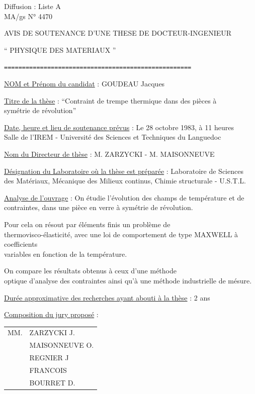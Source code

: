Diffusion : Liste A\\
MA/gs \qquad N° 4470

\begin{center}
AVIS DE SOUTENANCE D'UNE THESE DE DOCTEUR-INGENIEUR

`` PHYSIQUE \quad DES MATERIAUX ''

\texttt{====================================================}
\end{center}

\uline{NOM et Prénom du candidat} : GOUDEAU Jacques

\uline{Titre de la thèse} : ``Contraint de trempe thermique dans des pièces à\\
symétrie de révolution''

\uline{Date, heure et lieu de soutenance prévus} : Le 28 octobre 1983, à 11 heures\\
Salle de l'IREM - Université des Sciences et Techniques du Languedoc

\uline{Nom du Directeur de thèse} : M. ZARZYCKI - M. MAISONNEUVE

\uline{Désignation du Laboratoire où la thèse est préparée} : Laboratoire de Sciences\\
des Matériaux, Mécanique des Milieux continus, Chimie structurale - U.S.T.L.

\uline{Analyse de l'ouvrage} : On étudie l'évolution des champs de température et de\\
contraintes, dans une pièce en verre à symétrie de révolution.

Pour cela on résout par éléments finis un problème de\\
thermovisco-élasticité, avec une loi de comportement de type MAXWELL à coefficients\\
variables en fonction de la température.

On compare les résultats obtenus à ceux d'une méthode\\
optique d'analyse des contraintes ainsi qu'à une méthode industrielle de mésure.

\uline{Durée approximative des recherches ayant abouti à la thèse} : 2 ans

\uline{Composition du jury proposé} : \begin{tabular}[t]{ll}
MM. & ZARZYCKI J.\\
& MAISONNEUVE O.\\
& REGNIER J\\
& FRANCOIS\\
& BOURRET D.
\end{tabular}


